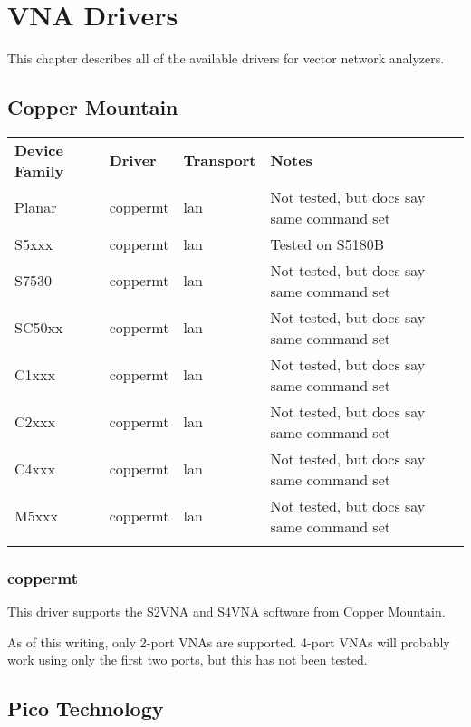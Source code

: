 \chapter{VNA Drivers}
\label{sec:vna-drivers}

This chapter describes all of the available drivers for vector network analyzers.

\section{Copper Mountain}

\begin{tabularx}{16cm}{lllX}
\thickhline
\textbf{Device Family} & \textbf{Driver} & \textbf{Transport} & \textbf{Notes} \\
\thickhline
Planar & coppermt & lan & Not tested, but docs say same command set \\
\thinhline
S5xxx  & coppermt & lan & Tested on S5180B \\
\thinhline
S7530 & coppermt & lan & Not tested, but docs say same command set \\
\thinhline
SC50xx & coppermt & lan & Not tested, but docs say same command set \\
\thinhline
C1xxx & coppermt & lan & Not tested, but docs say same command set \\
\thinhline
C2xxx & coppermt & lan & Not tested, but docs say same command set \\
\thinhline
C4xxx & coppermt & lan & Not tested, but docs say same command set \\
\thinhline
M5xxx & coppermt & lan & Not tested, but docs say same command set \\
\thickhline
\end{tabularx}

\subsection{coppermt}

This driver supports the S2VNA and S4VNA software from Copper Mountain.

As of this writing, only 2-port VNAs are supported. 4-port VNAs will probably work using only the first two ports,
but this has not been tested.

\section{Pico Technology}

